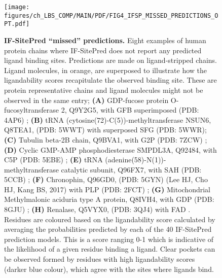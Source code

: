 \begin{figure}[ht!]
    \centering
    \texttt{[image: figures/ch\_LBS\_COMP/MAIN/PDF/FIG4\_IFSP\_MISSED\_PREDICTIONS\_OPT.pdf]}
    \caption[IF-SitePred ``missed'' predictions]{\textbf{IF-SitePred ``missed'' predictions.} Eight examples of human protein chains where IF-SitePred does not report any predicted ligand binding sites. Predictions are made on ligand-stripped chains. Ligand molecules, in orange, are superposed to illustrate how the ligandability scores recapitulate the observed binding site. These are protein representative chains and ligand molecules might not be observed in the same entry; \textbf{(A)} GDP-fucose protein O-fucosyltransferase 2, Q9Y2G5, with GFB superimposed (PDB: 4AP6) \cite{CHEN_2012_POFUT2}; \textbf{(B)} tRNA (cytosine(72)-C(5))-methyltransferase NSUN6, Q8TEA1, (PDB: 5WWT) \cite{LIU_2017_NSUN6} with superposed SFG (PDB: 5WWR); \textbf{(C)} Tubulin beta-2B chain, Q9BVA1, with G2P (PDB: 7ZCW) \cite{RAMIREZ_2023_VASH2}; \textbf{(D)} Cyclic GMP-AMP phosphodiesterase SMPDL3A, Q92484, with C5P (PDB: 5EBE) \cite{LIM_2016_SPHINGOMYELIN}; \textbf{(E)} tRNA (adenine(58)-N(1))-methyltransferase catalytic subunit, Q96FX7, with SAH (PDB: 5CCB) \cite{FINER_2015_tRNA}; \textbf{(F)} Chronophin, Q96GD0, (PDB: 5GYN) (Lee HJ, Cho HJ, Kang BS, 2017) with PLP (PDB: 2FCT) \cite{BLASIAK_2006_SYRB2}; \textbf{(G)} Mitochondrial Methylmalonic aciduria type A protein, Q8IVH4, with GDP (PDB: 8GJU) \cite{MASCARENHAS_2023_GPROTEIN}; \textbf{(H)} Renalase, Q5VYX0, (PDB: 3QJ4) with FAD \cite{MILANI_2011_NADP}. Residues are coloured based on the ligandability score calculated by averaging the probabilities predicted by each of the 40 IF-SitePred prediction models. This is a score ranging 0-1 which is indicative of the likelihood of a given residue binding a ligand. Clear pockets can be observed formed by residues with high ligandability scores (darker blue colour), which agree with the sites where ligands bind.}
    \label{fig:ifsp_missed_preds}
\end{figure}

